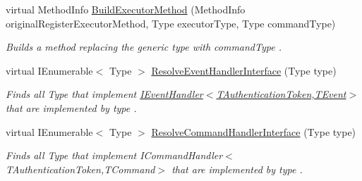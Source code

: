 \begin{DoxyCompactItemize}
virtual Method\+Info \hyperlink{classCqrs_1_1Configuration_1_1BusRegistrar_a03ecf12389b8f55b75c887e113520ac7_a03ecf12389b8f55b75c887e113520ac7}{Build\+Executor\+Method} (Method\+Info original\+Register\+Executor\+Method, Type executor\+Type, Type command\+Type)
\begin{DoxyCompactList}\small\item\em Builds a method replacing the generic type with {\itshape command\+Type} . \end{DoxyCompactList}\item 
virtual I\+Enumerable$<$ Type $>$ \hyperlink{classCqrs_1_1Configuration_1_1BusRegistrar_a0af1844a5f7f1c4adfde2499b054aaae_a0af1844a5f7f1c4adfde2499b054aaae}{Resolve\+Event\+Handler\+Interface} (Type type)
\begin{DoxyCompactList}\small\item\em Finds all Type that implement \hyperlink{interfaceCqrs_1_1Events_1_1IEventHandler}{I\+Event\+Handler$<$\+T\+Authentication\+Token,\+T\+Event$>$} that are implemented by {\itshape type} . \end{DoxyCompactList}\item 
virtual I\+Enumerable$<$ Type $>$ \hyperlink{classCqrs_1_1Configuration_1_1BusRegistrar_a0e118c57c7e804df1d810750befb25df_a0e118c57c7e804df1d810750befb25df}{Resolve\+Command\+Handler\+Interface} (Type type)
\begin{DoxyCompactList}\small\item\em Finds all Type that implement I\+Command\+Handler$<$\+T\+Authentication\+Token,\+T\+Command$>$ that are implemented by {\itshape type} . \end{DoxyCompactList}\end{DoxyCompactItemize}
